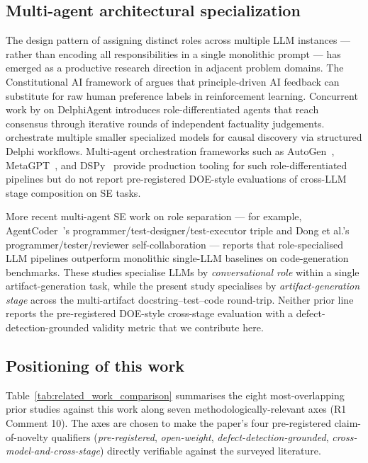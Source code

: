 \subsection{Multi-agent architectural specialization}

The design pattern of assigning distinct roles across multiple LLM instances --- rather than encoding all responsibilities in a single monolithic prompt --- has emerged as a productive research direction in adjacent problem domains. The Constitutional AI framework of \citet{Bai2022ConstitutionalAI} argues that principle-driven AI feedback can substitute for raw human preference labels in reinforcement learning. Concurrent work by \citet{Xiong2025DelphiAgent} on DelphiAgent introduces role-differentiated agents that reach consensus through iterative rounds of independent factuality judgements. \citet{Le2024CausalDiscovery} orchestrate multiple smaller specialized models for causal discovery via structured Delphi workflows. Multi-agent orchestration frameworks such as AutoGen~\citep{Wu2024AutoGen}, MetaGPT~\citep{Hong2025MetaGPT}, and DSPy~\citep{Khattab2024DSPy} provide production tooling for such role-differentiated pipelines but do not report pre-registered DOE-style evaluations of cross-LLM stage composition on SE tasks.

More recent multi-agent SE work on role separation --- for example, AgentCoder~\citep{Huang2024AgentCoder}'s programmer/test-designer/test-executor triple and Dong et al.'s~\citep{Dong2024SelfCollaboration} programmer/tester/reviewer self-collaboration --- reports that role-specialised LLM pipelines outperform monolithic single-LLM baselines on code-generation benchmarks. These studies specialise LLMs by \emph{conversational role} within a single artifact-generation task, while the present study specialises by \emph{artifact-generation stage} across the multi-artifact docstring--test--code round-trip. Neither prior line reports the pre-registered DOE-style cross-stage evaluation with a defect-detection-grounded validity metric that we contribute here.

\subsection{Positioning of this work}

Table~\ref{tab:related_work_comparison} summarises the eight most-overlapping prior studies against this work along seven methodologically-relevant axes (R1 Comment 10). The axes are chosen to make the paper's four pre-registered claim-of-novelty qualifiers (\emph{pre-registered}, \emph{open-weight}, \emph{defect-detection-grounded}, \emph{cross-model-and-cross-stage}) directly verifiable against the surveyed literature.

